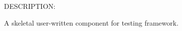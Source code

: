  
\setlength{\oldparskip}{\parskip}
\setlength{\parskip}{1.5ex}
\setlength{\oldparindent}{\parindent}
\setlength{\parindent}{0pt}
\setlength{\oldbaselineskip}{\baselineskip}
\setlength{\baselineskip}{11pt}
 
\def\bv{\begin{verbatim}}
\def\ev{\end{verbatim}}
\def\be{\begin{equation}}
\def\ee{\end{equation}}
\def\bea{\begin{eqnarray}}
\def\eea{\end{eqnarray}}
\def\bi{\begin{itemize}}
\def\ei{\end{itemize}}
\def\bn{\begin{enumerate}}
\def\en{\end{enumerate}}
\def\bd{\begin{description}}
\def\ed{\end{description}}
\def\({\left (}
\def\){\right )}
\def\[{\left [}
\def\]{\right ]}
\def\<{\left  \langle}
\def\>{\right \rangle}
\def\cI{{\cal I}}
\def\diag{\mathop{\rm diag}}
\def\tr{\mathop{\rm tr}}


 

  
{\sf DESCRIPTION:\\ }


    A skeletal user-written component for testing framework.
  
